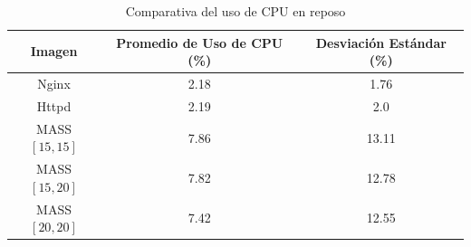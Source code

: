 \begin{table}[H]
    \centering
    \begin{tabular}{|c|c|c|}
        \hline
        \textbf{Imagen} & \textbf{Promedio de Uso de CPU (\%)} & \textbf{Desviación Estándar (\%)} \\ 
        \hline
        Nginx & 2.18 & 1.76 \\ 
        Httpd & 2.19 & 2.0 \\ 
        MASS$[15,15]$ & 7.86 & 13.11 \\ 
        MASS$[15,20]$ & 7.82 & 12.78 \\ 
        MASS$[20,20]$ & 7.42 & 12.55 \\ 
        \hline
    \end{tabular}
    \caption{Comparativa del uso de CPU en reposo}
    \end{table}

